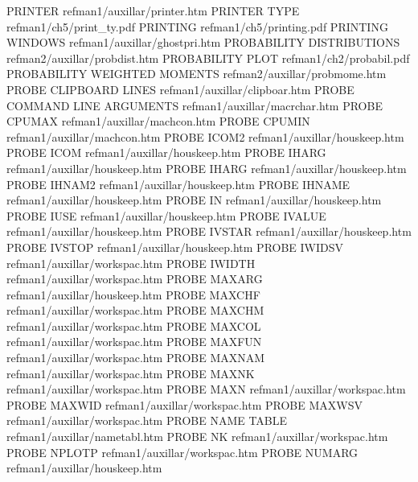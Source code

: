 PRINTER                                 refman1/auxillar/printer.htm
PRINTER TYPE                            refman1/ch5/print_ty.pdf
PRINTING                                refman1/ch5/printing.pdf
PRINTING WINDOWS                        refman1/auxillar/ghostpri.htm
PROBABILITY DISTRIBUTIONS               refman2/auxillar/probdist.htm
PROBABILITY PLOT                        refman1/ch2/probabil.pdf
PROBABILITY WEIGHTED MOMENTS            refman2/auxillar/probmome.htm
PROBE CLIPBOARD LINES                   refman1/auxillar/clipboar.htm
PROBE COMMAND LINE ARGUMENTS            refman1/auxillar/macrchar.htm
PROBE CPUMAX                            refman1/auxillar/machcon.htm
PROBE CPUMIN                            refman1/auxillar/machcon.htm
PROBE ICOM2                             refman1/auxillar/houskeep.htm
PROBE ICOM                              refman1/auxillar/houskeep.htm
PROBE IHARG                             refman1/auxillar/houskeep.htm
PROBE IHARG                             refman1/auxillar/houskeep.htm
PROBE IHNAM2                            refman1/auxillar/houskeep.htm
PROBE IHNAME                            refman1/auxillar/houskeep.htm
PROBE IN                                refman1/auxillar/houskeep.htm
PROBE IUSE                              refman1/auxillar/houskeep.htm
PROBE IVALUE                            refman1/auxillar/houskeep.htm
PROBE IVSTAR                            refman1/auxillar/houskeep.htm
PROBE IVSTOP                            refman1/auxillar/houskeep.htm
PROBE IWIDSV                            refman1/auxillar/workspac.htm
PROBE IWIDTH                            refman1/auxillar/workspac.htm
PROBE MAXARG                            refman1/auxillar/houskeep.htm
PROBE MAXCHF                            refman1/auxillar/workspac.htm
PROBE MAXCHM                            refman1/auxillar/workspac.htm
PROBE MAXCOL                            refman1/auxillar/workspac.htm
PROBE MAXFUN                            refman1/auxillar/workspac.htm
PROBE MAXNAM                            refman1/auxillar/workspac.htm
PROBE MAXNK                             refman1/auxillar/workspac.htm
PROBE MAXN                              refman1/auxillar/workspac.htm
PROBE MAXWID                            refman1/auxillar/workspac.htm
PROBE MAXWSV                            refman1/auxillar/workspac.htm
PROBE NAME TABLE                        refman1/auxillar/nametabl.htm
PROBE NK                                refman1/auxillar/workspac.htm
PROBE NPLOTP                            refman1/auxillar/workspac.htm
PROBE NUMARG                            refman1/auxillar/houskeep.htm
